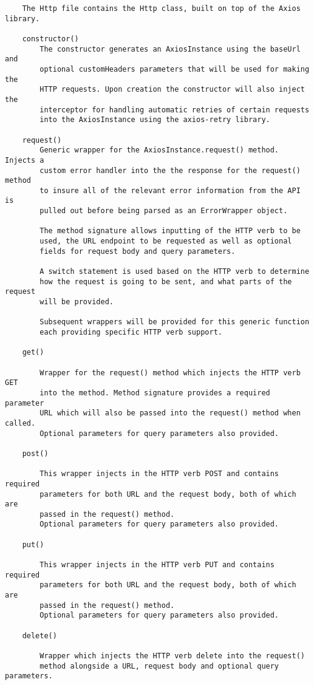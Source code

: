 \begin{verbatim}
    The Http file contains the Http class, built on top of the Axios library. 
    
    constructor()
        The constructor generates an AxiosInstance using the baseUrl and 
        optional customHeaders parameters that will be used for making the 
        HTTP requests. Upon creation the constructor will also inject the 
        interceptor for handling automatic retries of certain requests 
        into the AxiosInstance using the axios-retry library.
        
    request()
        Generic wrapper for the AxiosInstance.request() method. Injects a 
        custom error handler into the the response for the request() method 
        to insure all of the relevant error information from the API is 
        pulled out before being parsed as an ErrorWrapper object.
        
        The method signature allows inputting of the HTTP verb to be
        used, the URL endpoint to be requested as well as optional 
        fields for request body and query parameters.
        
        A switch statement is used based on the HTTP verb to determine
        how the request is going to be sent, and what parts of the request
        will be provided.
        
        Subsequent wrappers will be provided for this generic function
        each providing specific HTTP verb support.
        
    get()
    
        Wrapper for the request() method which injects the HTTP verb GET 
        into the method. Method signature provides a required parameter
        URL which will also be passed into the request() method when called.
        Optional parameters for query parameters also provided.
    
    post()
        
        This wrapper injects in the HTTP verb POST and contains required
        parameters for both URL and the request body, both of which are
        passed in the request() method.
        Optional parameters for query parameters also provided.
    
    put()
    
        This wrapper injects in the HTTP verb PUT and contains required
        parameters for both URL and the request body, both of which are
        passed in the request() method.
        Optional parameters for query parameters also provided.
    
    delete()
        
        Wrapper which injects the HTTP verb delete into the request()
        method alongside a URL, request body and optional query parameters.
        
\end{verbatim}
